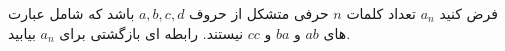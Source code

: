 \exercise
فرض کنید 
$a_n$
 تعداد کلمات 
$n$
  حرفی متشکل از حروف
$a, b, c, d$
   باشد که شامل عبارت های 
$ab$
   و 
$ba$
    و 
$cc$
     نیستند. رابطه ای بازگشتی برای 
$a_n$
      بیابید.